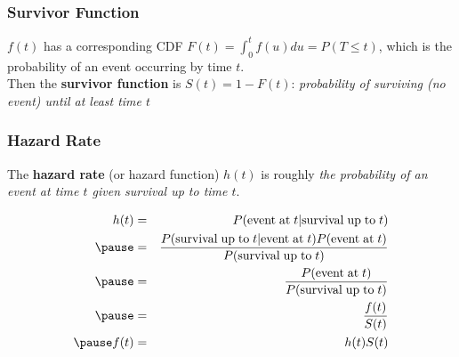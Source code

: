 \documentclass{beamer}
\begin{document}
\begin{frame}
\frametitle{Survivor Function}
\pause
$f(t)$ has a corresponding CDF $F(t) = \int_0^t f(u) du = P(T \le t)$,
which is the probability of an event occurring by time $t$.\\
\pause
\bigskip
Then the \textbf{survivor function} is $S(t) = 1 - F(t)$:
\emph{probability of surviving (no event) until at least time $t$}
\pause
\begin{figure}
\begin{center}
\end{center}
\end{figure}
\end{frame}

\begin{frame}
\frametitle{Hazard Rate}
\pause
The \textbf{hazard rate} (or hazard function) $h(t)$ is roughly \emph{the
probability of an event at time $t$ given survival up to time $t$}.\\
\pause

\begin{eqnarray*}
h(t) &=& P(\mathrm{event \; at}\; t | \mathrm{survival \; up \; to} \; t)\\
\pause
&=& \frac{P(\mathrm{survival \; up \; to\; } t | \mathrm{event \; at}
\; t)P(\mathrm{event \; at} \; t)}{P(\mathrm{survival \; up \; to} \; t)}\\
\pause
&=& \frac{P(\mathrm{event \; at \; }t)}{P(\mathrm{survival \; up \;
to} \;  t)}\\
\pause
&=& \frac{f(t)}{S(t)}\\
\pause
f(t) &=& h(t) S(t) 
\end{eqnarray*}
\end{frame}
\end{document}
